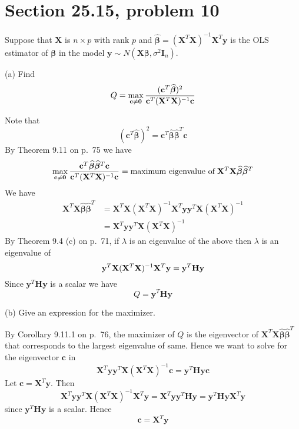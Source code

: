 \section{Section 25.15, problem 10}
Suppose that $\mathbf X$ is $n\times p$ with rank $p$ and
$\bm{\widehat\beta}=(\mathbf X^T\mathbf X)^{-1}\mathbf X^T
\mathbf y$ is the OLS estimator of $\bm\beta$ in the model
$\mathbf y\sim N(\mathbf X\bm\beta,\sigma^2\mathbf I_n)$.

\bigskip
\noindent
(a) Find
\[
Q=\max_{\mathbf c\ne\mathbf0}
{(\mathbf c^T\bm{\widehat\beta})^2
\over\mathbf c^T(\mathbf X^T\mathbf X)^{-1}\mathbf c}
\]

\bigskip
\noindent
Note that
\[
(\mathbf c^T\bm{\widehat\beta})^2
=\mathbf c^T\bm{\widehat\beta}\bm{\widehat\beta}^T\mathbf c
\]
By Theorem 9.11 on p.\ 75 we have
\[
\max_{\mathbf c\ne\mathbf0}
{\mathbf c^T\bm{\widehat\beta}\bm{\widehat\beta}^T\mathbf c
\over\mathbf c^T(\mathbf X^T\mathbf X)^{-1}\mathbf c}
=\hbox{maximum eigenvalue of}\;
\mathbf X^T\mathbf X\bm{\widehat\beta}\bm{\widehat\beta}^T
\]
We have
\begin{align*}
\mathbf X^T\mathbf X\bm{\widehat\beta}\bm{\widehat\beta}^T
&=
\mathbf X^T\mathbf X(\mathbf X^T\mathbf X)^{-1}
\mathbf X^T\mathbf y\mathbf y^T\mathbf X(\mathbf X^T\mathbf X)^{-1}\\
&=
\mathbf X^T\mathbf y\mathbf y^T\mathbf X(\mathbf X^T\mathbf X)^{-1}
\end{align*}
%
By Theorem 9.4 (c) on p.\ 71, if $\lambda$ is an eigenvalue of
the above then $\lambda$ is an eigenvalue of
\[
\mathbf y^T\mathbf X(\mathbf X^T\mathbf X)^{-1}\mathbf X^T\mathbf y\\
=
\mathbf y^T\mathbf H\mathbf y
\]
Since $\mathbf y^T\mathbf{Hy}$ is a scalar we have
\[
Q=\mathbf y^T\mathbf{Hy}
\]

\bigskip
\noindent
(b) Give an expression for the maximizer.

\bigskip
\noindent
By Corollary 9.11.1 on p.\ 76, the maximizer of $Q$ is the eigenvector
of $\mathbf X^T\mathbf X\bm{\widehat\beta}\bm{\widehat\beta}^T$
that corresponds to the largest eigenvalue of same.
Hence we want to solve for the eigenvector $\mathbf c$ in
\[
\mathbf X^T\mathbf y\mathbf y^T\mathbf X(\mathbf X^T\mathbf X)^{-1}
\mathbf c
=\mathbf y^T\mathbf{Hyc}
\]
Let $\mathbf c=\mathbf X^T\mathbf y$. Then
\[
\mathbf X^T\mathbf y\mathbf y^T\mathbf X(\mathbf X^T\mathbf X)^{-1}
\mathbf X^T\mathbf y
=
\mathbf X^T\mathbf y\mathbf y^T\mathbf{Hy}
=
\mathbf y^T\mathbf{HyX}^T\mathbf y
\]
since $\mathbf y^T\mathbf{Hy}$ is a scalar. Hence
\[
\mathbf c=\mathbf X^T\mathbf y
\]

